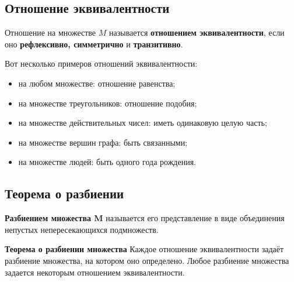 \documentclass[a4paper]{article}
\begin{document}
    \subsection*{Отношение эквивалентности
    }
    Отношение на множестве $M$ называется \textbf{отношением
    эквивалентности}, если оно \textbf{рефлексивно, симметрично} и \textbf{транзитивно}.

    Вот несколько примеров отношений эквивалентности:
    \begin{itemize}
        \item на любом множестве: отношение равенства;
        \item на множестве треугольников: отношение подобия;
        \item на множестве действительных чисел: иметь одинаковую целую часть;
        \item на множестве вершин графа: быть связанными;
        \item на множестве людей: быть одного года рождения.
    \end{itemize}


    \subsection*{Теорема о разбиении}
    \begin{definit}
        \textbf{Разбиением множества M} называется его представление в виде объединения непустых непересекающихся подмножеств.
    \end{definit}

    \begin{htheorem}
        \textbf{Теорема о разбиении множества}
        Каждое отношение эквивалентности
        задаёт разбиение множества, на котором оно определено. Любое разбиение множества задается некоторым отношением эквивалентности.
    \end{htheorem}
\end{document}
